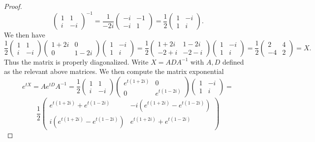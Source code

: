\documentclass[11pt, letterpaper]{article}
\theoremstyle{plain}
\begin{document}
\begin{proof}
	\[
		\begin{pmatrix}
		1 & 1 \\
		i & -i
		\end{pmatrix}^{-1} =\frac{1}{-2i} \begin{pmatrix}
		-i & -1 \\
		-i & 1
		\end{pmatrix}=\frac{1}{2} \begin{pmatrix}
		1 & -i \\
		1 & i
		\end{pmatrix}
	.\]
	We then have
	\[
		\frac{1}{2} \begin{pmatrix}
		1 & 1 \\
		i & -i
		\end{pmatrix}\begin{pmatrix}
		1+2i & 0 \\
		0 & 1-2i
		\end{pmatrix}\begin{pmatrix}
		1 & -i \\
		1 & i
		\end{pmatrix}=\frac{1}{2} \begin{pmatrix}
		1+2i & 1-2i \\
		-2+i & -2-i
		\end{pmatrix}\begin{pmatrix}
		1 & -i \\
		1 & i
		\end{pmatrix}=\frac{1}{2} \begin{pmatrix}
		2 & 4 \\
		-4 & 2
		\end{pmatrix}=X
	.\]
	Thus the matrix is properly diagonalized. Write $X=ADA^{-1} $ with $A,D$ defined as the relevant above matrices. We then compute the matrix exponential
	\[
		e^{tX} =A e^{tD} A^{-1} =\frac{1}{2}\begin{pmatrix}
		1 & 1 \\
		i & -i
		\end{pmatrix}\begin{pmatrix}
		e^{t(1+2i)}  & 0 \\
		0 & e^{t(1-2i)} 
		\end{pmatrix}\begin{pmatrix}
		1 & -i \\
		1 & i
		\end{pmatrix}=
	\]
	\[
		\frac{1}{2} \begin{pmatrix}
		e^{t(1+2i)} +e^{t(1-2i)}  & -i\left( e^{t(1+2i)} -e^{t(1-2i)}  \right)  \\
		i\left( e^{t(1+2i)} -e^{t(1-2i)}  \right)  & e^{t(1+2i)} +e^{t(1-2i)} 

\end{pmatrix}\]
\end{proof}
\end{document}
